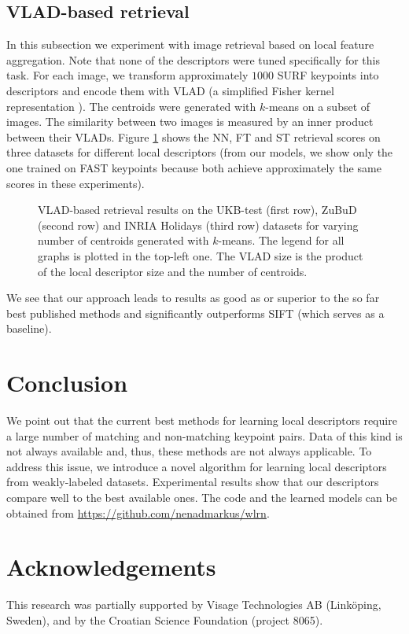 \documentclass[10pt,conference,a4paper]{IEEEtran}
\begin{document}
		\subsection{VLAD-based retrieval}
			In this subsection we experiment with image retrieval based on local feature aggregation.
			Note that none of the descriptors were tuned specifically for this task.
			For each image, we transform approximately $1000$ SURF \cite{surf} keypoints into descriptors and encode them with VLAD \cite{vlad} (a simplified Fisher kernel representation \cite{fisherkernel}).
			The centroids were generated with $k$-means on a subset of images.
			The similarity between two images is measured by an inner product between their VLADs.
			Figure \ref{fig:vlad} shows the NN, FT and ST retrieval scores on three datasets for different local descriptors
			(from our models, we show only the one trained on FAST keypoints because both achieve approximately the same scores in these experiments).
			\begin{figure}[ht]
				\centering
				\resizebox{1.99\columnwidth}{!}
				{
					
				}
				\resizebox{1.99\columnwidth}{!}
				{
					
				}
				\resizebox{1.99\columnwidth}{!}
				{
					
				}
				\caption
				{
					VLAD-based retrieval results on the UKB-test (first row), ZuBuD (second row) and INRIA Holidays (third row) datasets for varying number of centroids generated with $k$-means.
					The legend for all graphs is plotted in the top-left one.
					The VLAD size is the product of the local descriptor size and the number of centroids.
				}
				\label{fig:vlad}
			\end{figure}
			We see that our approach leads to results as good as or superior to the so far best published methods and significantly outperforms SIFT (which serves as a baseline).

	\section{Conclusion}
		We point out that the current best methods for learning local descriptors require a large number of matching and non-matching keypoint pairs.
		Data of this kind is not always available and, thus, these methods are not always applicable.
		To address this issue, we introduce a novel algorithm for learning local descriptors from weakly-labeled datasets.
		Experimental results show that our descriptors compare well to the best available ones.
		The code and the learned models can be obtained from \url{https://github.com/nenadmarkus/wlrn}. %

	\section*{Acknowledgements}
	This research was partially supported by Visage Technologies AB (Link\"oping, Sweden), and by the Croatian Science Foundation (project 8065).

	
	
\end{document}
